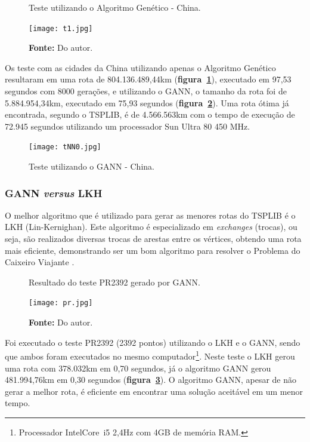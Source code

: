 \documentclass[12pt,openright,a4paper,twoside]{tcc}
\begin{document}
   		\begin{figure}[h]
			\centering
            \caption{Teste utilizando o Algoritmo Genético - China.}
	        \texttt{[image: t1.jpg]}
	        \caption*{\textbf{Fonte:} Do autor.}
	        \label{figt1}
   		\end{figure}

        Os teste com as cidades da China utilizando apenas o Algoritmo Genético resultaram em uma rota de 804.136.489,44km (\textbf{figura~\ref{figt1}}), executado em 97,53 segundos com 8000 gerações, e utilizando o GANN, o tamanho da rota foi de 5.884.954,34km, executado em 75,93 segundos (\textbf{figura~\ref{figtNN0}}). Uma rota ótima já encontrada, segundo o TSPLIB, é de 4.566.563km com o tempo de execução de 72.945 segundos utilizando um processador Sun Ultra 80 450 MHz.
        \begin{figure}[h]
            \centering
            \caption{Teste utilizando o GANN - China.}
            \texttt{[image: tNN0.jpg]}
            \label{figtNN0}
        \end{figure}

        
   		\subsubsection{GANN \textit{versus} LKH}

		O melhor algoritmo que é utilizado para gerar as menores rotas do TSPLIB é o LKH (Lin-Kernighan). Este algoritmo é especializado em \textit{exchanges} (trocas), ou seja, são realizados diversas trocas de arestas entre os vértices, obtendo uma rota mais eficiente, demonstrando ser um bom algoritmo para resolver o Problema do Caixeiro Viajante \cite{LKH}. 

		\begin{figure}[h]
			\centering
            \caption{Resultado do teste PR2392 gerado por GANN.}
		    \texttt{[image: pr.jpg]}
		    \caption*{\textbf{Fonte:} Do autor.}
		    \label{figpa}
		\end{figure}

		Foi executado o teste PR2392 (2392 pontos) utilizando o LKH e o GANN, sendo que ambos foram executados no mesmo computador\footnote{Processador Intel\textregistered Core\texttrademark ~i5 2,4Hz com 4GB de memória RAM.}. Neste teste o LKH gerou uma rota com 378.032km em 0,70 segundos, já o algoritmo GANN gerou 481.994,76km em 0,30 segundos (\textbf{figura~\ref{figpa}}).
		O algoritmo GANN, apesar de não gerar a melhor rota, é eficiente em encontrar uma solução aceitável em um menor tempo.
\end{document}

